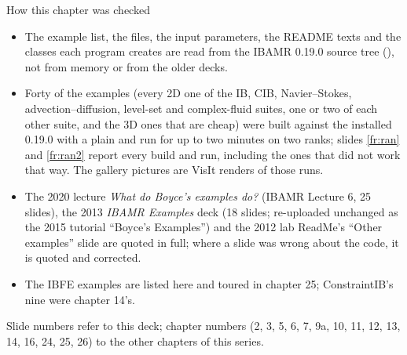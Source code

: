 \documentclass[aspectratio=169,11pt]{beamer}
\begin{document}
\begin{frame}{How this chapter was checked}
\label{fr:checked}
\begin{itemize}\footnotesize
  \item The example list, the files, the input parameters, the README texts and the classes each program creates are read from the IBAMR 0.19.0 source tree (), not from memory or from the older decks.
  \item Forty of the examples (every 2D one of the IB, CIB, Navier--Stokes, advection--diffusion, level-set and complex-fluid suites, one or two of each other suite, and the 3D ones that are cheap) were built against the installed 0.19.0 with a plain  and run for up to two minutes on two ranks; slides \ref{fr:ran} and \ref{fr:ran2} report every build and run, including the ones that did not work that way. The gallery pictures are VisIt renders of those runs.
  \item The 2020 lecture \emph{What do Boyce's examples do?} (IBAMR Lecture 6, 25 slides), the 2013 \emph{IBAMR Examples} deck (18 slides; re-uploaded unchanged as the 2015 tutorial ``Boyce's Examples'') and the 2012 lab ReadMe's ``Other examples'' slide are quoted in full; where a slide was wrong about the code, it is quoted and corrected.
  \item The IBFE examples are listed here and toured in chapter 25; ConstraintIB's nine were chapter 14's.
\end{itemize}
\begin{punchbox}
\footnotesize Slide numbers refer to this deck; chapter numbers (2, 3, 5, 6, 7, 9a, 10, 11, 12, 13, 14, 16, 24, 25, 26) to the other chapters of this series.
\end{punchbox}
\end{frame}
\end{document}
